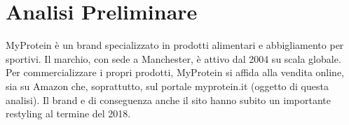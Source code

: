 \section{Analisi Preliminare}
MyProtein è un brand specializzato in prodotti alimentari e abbigliamento per sportivi. Il marchio, con sede a Manchester, è attivo dal 2004 su scala globale. Per commercializzare i propri prodotti, MyProtein si affida alla vendita online, sia su Amazon che, soprattutto, sul portale myprotein.it (oggetto di questa analisi). Il brand e di conseguenza anche il sito hanno subito un importante restyling al termine del 2018.\\